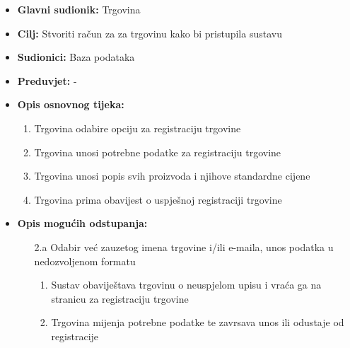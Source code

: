                         \noindent {}
					\begin{itemize}
	
						\item \textbf{Glavni sudionik: }Trgovina
						\item  \textbf{Cilj:} Stvoriti račun za za trgovinu kako bi pristupila sustavu
						\item  \textbf{Sudionici:} Baza podataka
						\item  \textbf{Preduvjet:} -
						\item  \textbf{Opis osnovnog tijeka:}
						
						\item[] \begin{enumerate}
							\item Trgovina odabire opciju za registraciju trgovine
                                \item Trgovina unosi potrebne podatke za registraciju trgovine
                                \item Trgovina unosi popis svih proizvoda i njihove standardne cijene
                                \item Trgovina prima obavijest o uspješnoj registraciji trgovine
						\end{enumerate}

                            \item  \textbf{Opis mogućih odstupanja:}
						
						\item[] \begin{enumerate}
	
							\item[2.a] Odabir već zauzetog imena trgovine i/ili e-maila, unos podatka u nedozvoljenom formatu
							\item[] \begin{enumerate}
								
								\item Sustav obaviještava trgovinu o neuspjelom upisu i vraća ga na stranicu za registraciju trgovine
								\item Trgovina mijenja potrebne podatke te zavrsava unos ili odustaje od registracije\\
								
							\end{enumerate}
			
							
						\end{enumerate}
						
					\end{itemize}

